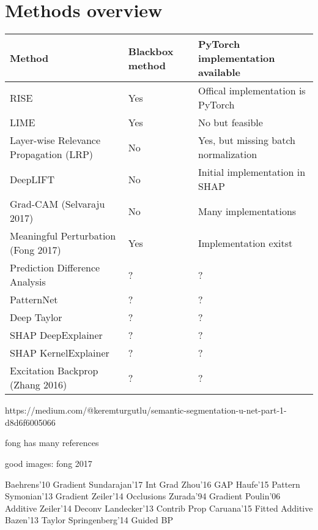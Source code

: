 \section{Methods overview}

\begin{tabular}{| p{7cm} | p{2.5cm} | p{6cm} | }
\hline
\textbf{Method} & \textbf{Blackbox method} & \textbf{PyTorch implementation available} \\ \hline

RISE\cite{Petsiuk2018rise} & Yes & Offical implementation is PyTorch \\ \hline
LIME\cite{ribeiro2016should} & Yes & No but feasible \\ \hline
Layer-wise Relevance Propagation (LRP) & No & Yes, but missing batch normalization\cite{lrppytorch} \\ \hline
DeepLIFT & No & Initial implementation in SHAP\cite{NIPS2017_7062} \\ \hline
Grad-CAM (Selvaraju 2017) & No & Many implementations \\ \hline
Meaningful Perturbation (Fong 2017)\cite{fong2017interpretable} & Yes & Implementation exitst \cite{fong2017implementation} \\ \hline

Prediction Difference Analysis \cite{todo} & ? & ? \\ \hline
PatternNet & ? & ? \\ \hline
Deep Taylor & ? & ? \\ \hline
SHAP DeepExplainer\cite{NIPS2017_7062} & ? & ? \\ \hline
SHAP KernelExplainer\cite{NIPS2017_7062} & ? & ? \\ \hline
Excitation Backprop (Zhang 2016)\cite{todo}  & ? & ? \\ \hline

\end{tabular}



https://medium.com/@keremturgutlu/semantic-segmentation-u-net-part-1-d8d6f6005066


fong has many references

good images: fong 2017

Baehrens'10 Gradient
Sundarajan'17 Int Grad
Zhou'16 GAP
Haufe'15 Pattern
Symonian'13 Gradient
Zeiler'14 Occlusions
Zurada'94 Gradient
Poulin'06 Additive
Zeiler'14 Deconv
Landecker'13 Contrib Prop
Caruana'15 Fitted Additive
Bazen'13 Taylor
Springenberg'14 Guided BP


